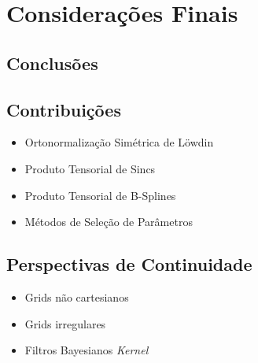 \chapter{Considerações Finais} \label{cap:consideracoes}

\section{Conclusões}

\section{Contribuições}

\begin{itemize}
    \item Ortonormalização Simétrica de Löwdin
    \item Produto Tensorial de Sincs
    \item Produto Tensorial de B-Splines
    \item Métodos de Seleção de Parâmetros
\end{itemize}

\section{Perspectivas de Continuidade}

\begin{itemize}
    \item Grids não cartesianos
    \item Grids irregulares
    \item Filtros Bayesianos \textit{Kernel}
\end{itemize}